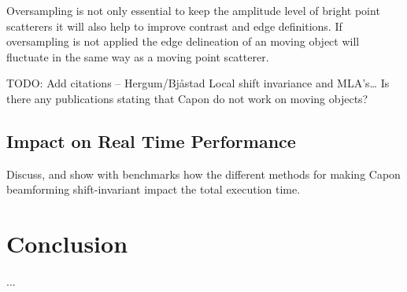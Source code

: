 \documentclass[journal]{IEEEtran}
\begin{document}
Oversampling is not only essential to keep the amplitude level of bright point scatterers it will also help to improve contrast and edge definitions. If oversampling is not applied the edge delineation of an moving object will fluctuate in the same way as a moving point scatterer. 

TODO: Add citations – Hergum/Bjåstad Local shift invariance and MLA’s… Is there any publications stating that Capon do not work on moving objects?

\subsection{Impact on Real Time Performance}
Discuss, and show with benchmarks how the different methods for making Capon beamforming shift-invariant impact the total execution time.

\section{Conclusion}\label{sec:con}
...


%
%

\end{document}
